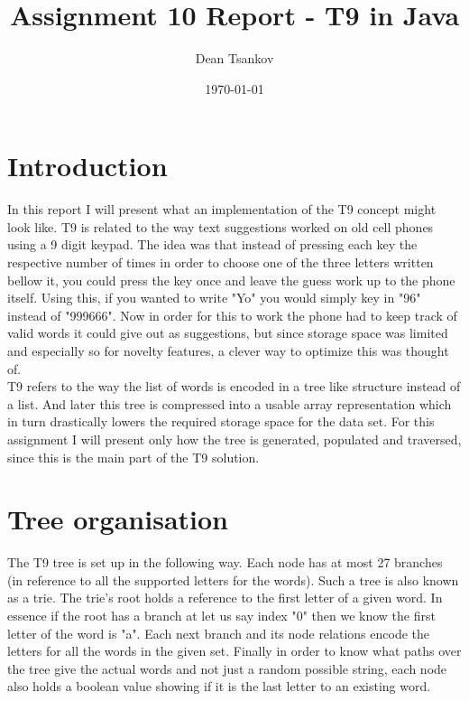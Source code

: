 \documentclass[a4paper,11pt]{article}
\begin{document}
\title{
    \textbf{Assignment 10 Report - T9 in Java}
}
\author{Dean Tsankov}
\date{\today}

\maketitle

\section*{Introduction}

In this report I will present what an implementation of the T9 concept might look like. T9 is related to the way text suggestions worked on old cell phones using a 9 digit keypad. The idea was that instead of pressing each key the respective number of times in order to choose one of the three letters written bellow it, you could press the key once and leave the guess work up to the phone itself. Using this, if you wanted to write "Yo" you would simply key in "96" instead of "999666". Now in order for this to work the phone had to keep track of valid words it could give out as suggestions, but since storage space was limited and especially so for novelty features, a clever way to optimize this was thought of. 
\\

T9 refers to the way the list of words is encoded in a tree like structure instead of a list. And later this tree is compressed into a usable array representation which in turn drastically lowers the required storage space for the data set. For this assignment I will present only how the tree is generated, populated and traversed, since this is the main part of the T9 solution.

\section*{Tree organisation}

The T9 tree is set up in the following way. Each node has at most 27 branches (in reference to all the supported letters for the words). Such a tree is also known as a trie. The trie's root holds a reference to the first letter of a given word. In essence if the root has a branch at let us say index "0" then we know the first letter of the word is "a". Each next branch and its node relations encode the letters for all the words in the given set. Finally in order to know what paths over the tree give the actual words and not just a random possible string, each node also holds a boolean value showing if it is the last letter to an existing word.
\\
\end{document}
